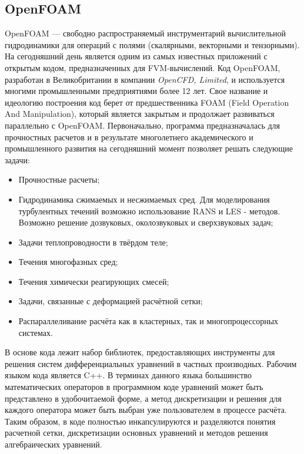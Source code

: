 	\subsection{OpenFOAM}
		\hspace{2em}OpenFOAM — свободно распространяемый инструментарий вычислительной гидродинамики для операций с полями (скалярными, векторными и тензорными). На сегодняшний день является одним из самых известных приложений с открытым кодом, предназначенных для FVM-вычислений.\cite{openfoam}
		Код OpenFOAM, разработан в Великобритании в компании \textit{OpenCFD, Limited}, и используется многими промышленными предприятиями более 12 лет. Свое название и идеологию построения код берет от предшественника FOAM (Field Operation And Manipulation), который является закрытым и продолжает развиваться параллельно с OpenFOAM. Первоначально, программа предназначалась для прочностных расчетов и в результате многолетнего академического и промышленного развития на сегодняшний момент позволяет решать следующие задачи:
	\begin{itemize}
		\item Прочностные расчеты;
		\item Гидродинамика сжимаемых и несжимаемых сред. Для моделирования турбулентных течений возможно использование RANS и LES - методов. Возможно решение дозвуковых, околозвуковых и сверхзвуковых задач;
		\item Задачи теплопроводности в твёрдом теле;
		\item Течения многофазных сред;
		\item Течения химически реагирующих смесей;
		\item Задачи, связанные с деформацией расчётной сетки;
		\item Распараллеливание расчёта как в кластерных, так и многопроцессорных системах.
	\end{itemize}

	В основе кода лежит набор библиотек, предоставляющих инструменты для решения систем дифференциальных уравнений в частных производных. Рабочим языком кода является C++. В терминах данного языка большинство математических операторов в программном коде уравнений может быть представлено в удобочитаемой форме, а метод дискретизации и решения для каждого оператора может быть выбран уже пользователем в процессе расчёта. Таким образом, в коде полностью инкапсулируются и разделяются понятия расчетной сетки, дискретизации основных уравнений и методов решения алгебраических уравнений.
